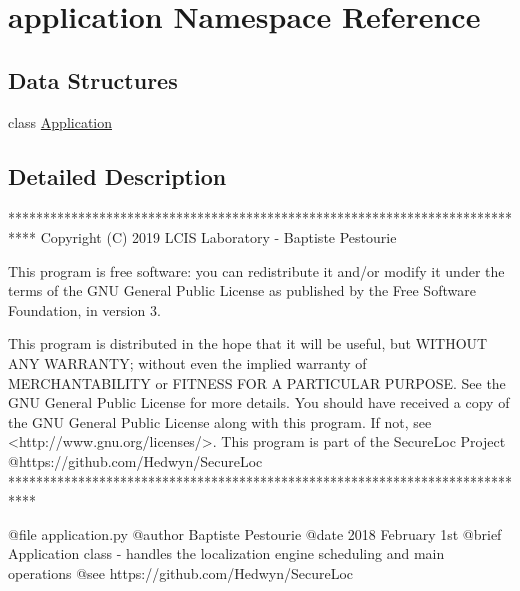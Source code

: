\hypertarget{namespaceapplication}{}\section{application Namespace Reference}
\label{namespaceapplication}
\subsection*{Data Structures}
\begin{DoxyCompactItemize}
\item 
class \mbox{\hyperlink{classapplication_1_1_application}{Application}}
\end{DoxyCompactItemize}


\subsection{Detailed Description}
\begin{DoxyVerb}****************************************************************************
Copyright (C) 2019 LCIS Laboratory - Baptiste Pestourie

This program is free software: you can redistribute it and/or modify
it under the terms of the GNU General Public License as published by
the Free Software Foundation, in version 3.

This program is distributed in the hope that it will be useful,
but WITHOUT ANY WARRANTY; without even the implied warranty of
MERCHANTABILITY or FITNESS FOR A PARTICULAR PURPOSE. See the
GNU General Public License for more details.
You should have received a copy of the GNU General Public License
along with this program. If not, see <http://www.gnu.org/licenses/>.
This program is part of the SecureLoc Project @https://github.com/Hedwyn/SecureLoc
 ****************************************************************************

@file application.py
@author Baptiste Pestourie
@date 2018 February 1st
@brief Application class - handles the localization engine scheduling and main operations
@see https://github.com/Hedwyn/SecureLoc
\end{DoxyVerb}
 